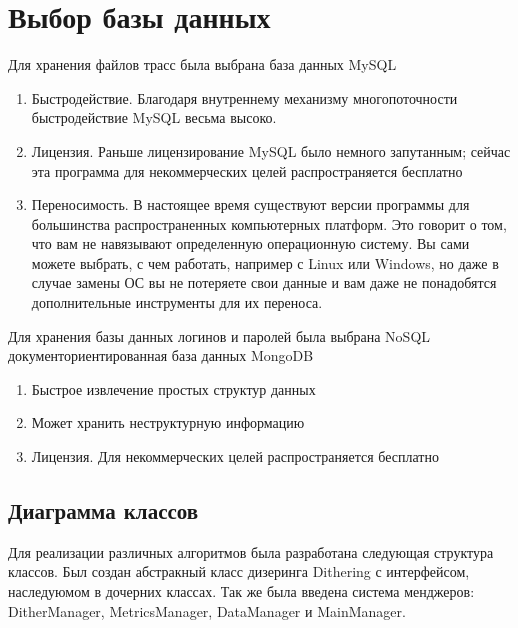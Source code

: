 \section{Выбор базы данных}
Для хранения файлов трасс была выбрана база данных MySQL
\begin{enumerate}
	\item Быстродействие. Благодаря внутреннему механизму многопоточности быстродействие MySQL весьма высоко.
	\item Лицензия. Раньше лицензирование MySQL было немного запутанным; сейчас эта программа для некоммерческих целей распространяется бесплатно
	\item Переносимость. В настоящее время существуют версии программы для большинства распространенных компьютерных платформ. Это говорит о том, что вам не навязывают определенную операционную систему. Вы сами можете выбрать, с чем работать, например с Linux или Windows, но даже в случае замены ОС вы не потеряете свои данные и вам даже не понадобятся дополнительные инструменты для их переноса.
\end{enumerate}
Для хранения базы данных логинов и паролей была выбрана NoSQL документориентированная база данных MongoDB
\begin{enumerate}
	\item Быстрое извлечение простых структур данных
	
	\item Может хранить неструктурную информацию
	 \item Лицензия. Для некоммерческих целей распространяется бесплатно
\end{enumerate}
\subsection{Диаграмма классов}
Для реализации различных алгоритмов была разработана следующая структура классов. Был создан абстракный класс дизеринга Dithering с интерфейсом, наследуюмом в дочерних классах. Так же была введена система менджеров: DitherManager, MetricsManager, DataManager и MainManager.


